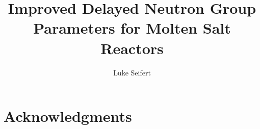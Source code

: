 \documentclass[edeposit,fullpage,hidelinks]{uiucthesis2021}
\title{Improved Delayed Neutron Group Parameters for Molten Salt Reactors}
\author{Luke Seifert}
\begin{document}
\maketitle

\frontmatter
\begin{abstract}



\end{abstract}
\glsresetall

\chapter*{Acknowledgments}




\tableofcontents


\pagebreak
\mainmatter






\backmatter



\end{document}
